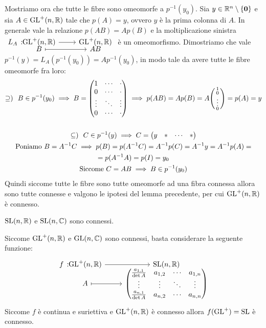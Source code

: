 \begin{demonstration}
	Mostriamo ora che tutte le fibre sono omeomorfe a $p^{-1}(y_0)$. Sia $y\in\mathbb{R}^n\setminus\{\mathbf{0}\}$ e sia $A\in\operatorname{GL}^+(n,\mathbb{R})$ tale che $p(A)=y$, ovvero $y$ è la prima colonna di $A$. In generale vale la relazione $p(AB)=Ap(B)$ e la moltiplicazione sinistra $\displaystyle \funztot {L_A} {\gl^+(n,\realset)} {\gl^+(n,\realset)} B {AB}$ è un omeomorfismo. Dimostriamo che vale $p^{-1}(y)=L_A\left( p^{-1}(y_0)\right)=Ap^{-1}(y_0)$, in modo tale da avere tutte le fibre omeomorfe fra loro:
		\begin{gather*}
			\supseteq ) \ \ B\in p^{-1}(y_0) \implies B=\begin{pmatrix}
				1	   & \cdots  & \cdot  \\
				0 	   & \cdots  & \cdot   \\
				\vdots & \ddots  & \vdots   \\
				0      & \cdots  & \cdot
			\end{pmatrix} \implies	p(AB)=Ap(B)=A\begin{psmallmatrix}
					1 \\ 0 \\ \vdots \\ 0
				\end{psmallmatrix}= p(A)=y \\
			\\
			\subseteq ) \ \  C\in p^{-1}(y) \implies C=\begin{pmatrix}
				y & * & \cdots & *
				\end{pmatrix}\\
			\text{Poniamo } B=A^{-1}C\implies p(B)=p(A^{-1}C)=A^{-1}p(C)=A^{-1}y=A^{-1}p(A)=\\
			=p(A^{-1}A)=p(I)=y_0\\
			\text{Siccome } C=AB \implies B\in p^{-1}(y_0)
		\end{gather*}
	Quindi siccome tutte le fibre sono tutte omeomorfe ad una fibra connessa allora sono tutte connesse e valgono le ipotesi del lemma precedente, per cui $\operatorname{GL}^+(n,\mathbb{R})$ è connesso.
\end{demonstration}

\begin{corollary}
	$\operatorname{SL}(n,\mathbb{R})$ e $\operatorname{SL}(n,\mathbb{C})$ sono connessi.
\end{corollary}
\begin{demonstration}
	Siccome $\operatorname{GL}^+(n,\mathbb{R})$ e $\operatorname{GL}(n,\mathbb{C})$ sono connessi, basta considerare la seguente funzione:
		\begin{gather*}
			\funztot f {\gl^+(n,\realset)} {\Sl(n,\realset)} A {
				\begin{pmatrix}
					\frac{a_{1,1}}{\det A} & a_{1,2} & \cdots  & a_{1,n} \\
					\vdots                 & \vdots  & \ddots  & \vdots \\
					\frac{a_{n,1}}{\det A} & a_{n,2} & \cdots  & a_{n,n}
				\end{pmatrix}
			}			
		\end{gather*}
	Siccome $f$ è continua e suriettiva e $\operatorname{GL}^+(n,\mathbb{R})$ è connesso allora $f(\operatorname{GL}^+)=\operatorname{SL}$ è connesso.
\end{demonstration}


